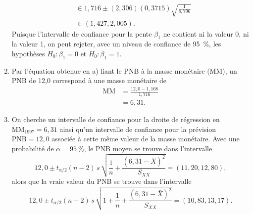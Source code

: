 \begin{solution}{2.16}
\begin{enumerate}
\begin{align*}
        &\in 1,716 \pm (2,306) (0,3715) \sqrt{\frac{1}{8,796}} \\
        &\in (1,427, 2,005).
      \end{align*}
      Puisque l'intervalle de confiance pour la pente $\beta_1$ ne
      contient ni la valeur 0, ni la valeur 1, on peut rejeter, avec
      un niveau de confiance de 95~\%, les hypothèses $H_0: \beta_1 =
      0$ et $H_0: \beta_1 = 1$.
    \item Par l'équation obtenue en a) liant le PNB à la masse
      monétaire (MM), un PNB de 12,0 correspond à une masse monétaire
      de
      \begin{align*}
        \text{MM}
        &= \frac{12,0 - 1,168}{1,716} \\
        &= 6,31.
      \end{align*}
    \item On cherche un intervalle de confiance pour la droite de
      régression en $\text{MM}_{1997} = 6,31$ ainsi qu'un intervalle
      de confiance pour la prévision $\text{PNB} = 12,0$ associée à
      cette même valeur de la masse monétaire.  Avec une probabilité
      de $\alpha = 95~\%$, le PNB moyen se trouve dans l'intervalle
      \begin{displaymath}
        12,0 \pm t_{\alpha/2}(n - 2)\, s\,
        \sqrt{\frac{1}{n} + \frac{(6,31 - \bar{X})^2}{S_{XX}}} =
        (11,20, 12,80),
      \end{displaymath}
      alors que la vraie valeur du PNB se trouve dans l'intervalle
      \begin{displaymath}
        12,0 \pm t_{\alpha/2}(n - 2)\, s\,
        \sqrt{1 + \frac{1}{n} + \frac{(6,31 - \bar{X})^2}{S_{XX}}} =
        (10,83, 13,17).
      \end{displaymath}
    \end{enumerate}
  
\end{solution}
